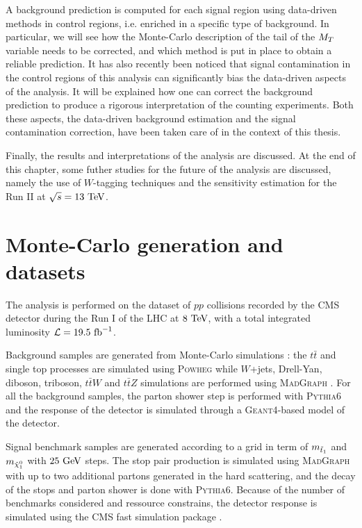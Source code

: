     A background prediction is computed for each signal region using data-driven methods
    in control regions, i.e. enriched in a specific type of background. In particular, we
    will see how the Monte-Carlo description of the tail of the $M_T$ variable needs to be
    corrected, and which method is put in place to obtain a reliable prediction.
    It has also recently been noticed that signal contamination in the control regions of
    this analysis can significantly bias the data-driven aspects of the analysis. It will
    be explained how one can correct the background prediction to produce a rigorous
    interpretation of the counting experiments. Both these aspects, the data-driven
    background estimation and the signal contamination correction, have been taken care
    of in the context of this thesis.

    Finally, the results and interpretations of the analysis are discussed. At the end
    of this chapter, some futher studies for the future of the analysis are discussed,
    namely the use of $W$-tagging techniques and the sensitivity estimation for the Run II
    at $\sqrt{s} = 13~\text{TeV}$.

    \section{Monte-Carlo generation and datasets}

    The analysis is performed on the dataset of $pp$ collisions recorded by the CMS detector
    during the Run I of the LHC at $8~\text{TeV}$, with a total integrated luminosity
    $\mathcal{L} = 19.5~\text{fb}^{-1}$.

    Background samples are generated from Monte-Carlo simulations : the $t\bar{t}$ and
    single top processes are simulated using \textsc{Powheg} \cite{Powheg} while $W$+jets,
    Drell-Yan, diboson, triboson, $t\bar{t}W$ and $t\bar{t}Z$ simulations are performed
    using \textsc{MadGraph} \cite{Madgraph}. For all the background samples, the
    parton shower step is performed with \textsc{Pythia}6 \cite{Pythia} and the response of
    the detector is simulated through a \textsc{Geant4}-based model of the detector.

    Signal benchmark samples are generated according to a grid in term of $m_{\tilde{t}_1}$
    and $m_{\tilde{\chi}_1^0}$ with $25~\text{GeV}$ steps. The stop pair production is simulated
    using \textsc{MadGraph} with up to two additional partons generated in the hard scattering,
    and the decay of the stops and parton shower is done with \textsc{Pythia6}. Because
    of the number of benchmarks considered and ressource constrains, the detector
    response is simulated using the CMS fast simulation package \cite{FastSim}.


